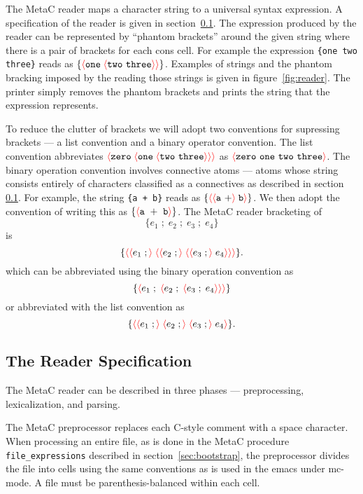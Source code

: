 \documentclass{article}
\newcommand{\mtt}[1]{\mbox{\tt #1}}
\newcommand{\fopen}{{\color{red} \langle}}
\newcommand{\fclose}{{\color{red} \rangle}}
\begin{document}
The MetaC reader maps a character string to a universal syntax expression.  A specification of the reader is given in section~\ref{sec:reader}.
The expression produced by the reader
can be represented by ``phantom brackets'' around the given string
where there is a pair of brackets for each cons cell.
For example the expression \mtt{\{one two three\}} reads as $\{\fopen \mathtt{one}\;\fopen \mathtt{two~three}\fclose \fclose\}$.
Examples of strings and the phantom bracking imposed by the reading those strings is given in figure~{\ref{fig:reader}}.
The printer simply removes the phantom brackets and prints the string that the expression represents.

To reduce the clutter of brackets we will adopt two conventions for supressing brackets --- a list convention and a binary operator convention.
The list convention abbreviates $\fopen \mathtt{zero}\;\fopen \mathtt{one}\;\fopen \mathtt{two~three}\fclose \fclose \fclose$
as $\fopen\mathtt{zero~one~two~three}\fclose$.  The binary operation convention involves connective atoms --- atoms whose string consists entirely of
characters classified as a connectives as described in section \ref{sec:reader}.  For example, the string \mtt{\{a + b\}} reads as
$\{\fopen \fopen \mathtt{a~+} \fclose \;\mathtt{b} \fclose \}$.  We then adopt the convention of writing this as
$\{\fopen \mathtt{a~+~b} \fclose \}$.
The MetaC reader bracketing of
$$\{e_1\;;\;e_2\;;\;e_3\;;\;e_4\}$$
is $$\{\fopen \fopen e_1\;;\fclose \;\fopen \fopen e_2\;;\fclose \;\fopen \fopen e_3\;;\fclose\;e_4\fclose\fclose\fclose\}.$$
which can be abbreviated using the binary operation convention as
$$\{\fopen e_1\;;\;\fopen e_2\;;\;\fopen e_3\;;\;e_4\fclose\fclose\fclose\}$$
or abbreviated with the list convention as
$$\{\fopen \fopen e_1\;;\fclose \;\fopen e_2\;;\fclose \;\fopen e_3\;;\fclose\;e_4\fclose\}.$$




\subsection{The Reader Specification}
\label{sec:reader}

The MetaC reader can be described in three phases --- preprocessing, lexicalization, and parsing.

The MetaC preprocessor replaces each C-style comment with a space character.  When processing an entire file,
as is done in the MetaC procedure {\tt file\_expressions}
described in section~\ref{sec:bootstrap}, the preprocessor divides the file into
cells using the same conventions as is used in the emacs under mc-mode.
A file must be parenthesis-balanced within each cell.
\end{document}
